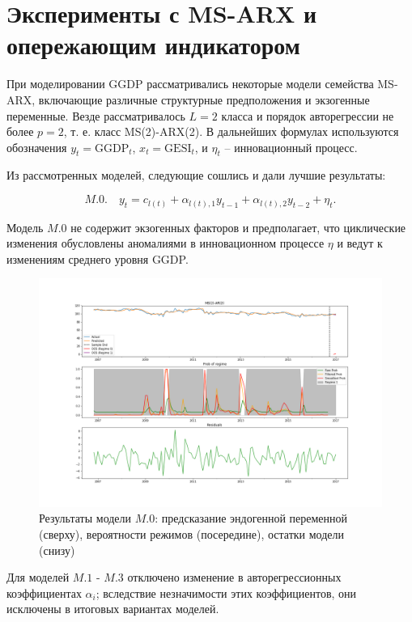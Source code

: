 \documentclass[a4paper,14pt]{extreport}
\begin{document}
\section{Эксперименты с MS-ARX и опережающим индикатором}

При моделировании GGDP рассматривались некоторые модели семейства MS-ARX, включающие различные структурные предположения и экзогенные переменные. Везде рассматривалось $L=2$ класса и порядок авторегрессии не более $p=2$, т. е. класс MS(2)-ARX(2). В дальнейших формулах используются обозначения $y_t = \text{GGDP}_t$, $x_t = \text{GESI}_t$, и $\eta_t$ -- инновационный процесс.

Из рассмотренных моделей, следующие сошлись и дали лучшие результаты:

\begin{equation}
	M.0. \quad y_t = c_{l(t)} + \alpha_{l(t), 1} y_{t-1} + \alpha_{l(t), 2} y_{t-2} + \eta_t .
\end{equation}

Модель $M.0$ не содержит экзогенных факторов и предполагает, что циклические изменения обусловлены аномалиями в инновационном процессе $\eta$ и ведут к изменениям среднего уровня GGDP.

\begin{figure}[H]
	\includegraphics[width=\linewidth]{img/manual/model_m0.png}
	\caption{Результаты модели $M.0$: предсказание эндогенной переменной (сверху), вероятности режимов (посередине), остатки модели (снизу)}
	\label{fig:sm_model_m0}
\end{figure}

Для моделей $M.1$ - $M.3$ отключено изменение в авторегрессионных коэффициентах $\alpha_i$; вследствие незначимости этих коэффициентов, они исключены в итоговых вариантах моделей.
\end{document}
